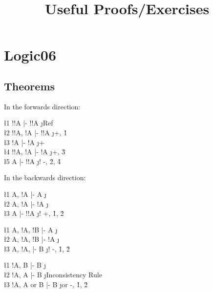 \documentclass[class=cs245,leqno]{agony}
\title{Useful Proofs/Exercises}
\begin{document}
\thispagestyle{firstpage}
\tableofcontents

\section{Logic06}
\subsection{Theorems}
\begin{theorem}
\end{theorem}
\begin{prf}
  In the forwards direction:
  \begin{deduce}
    \l1 !!A     |- !!A \j {Ref}           \\
    \l2 !!A, !A |- !!A \j {+, \r1}        \\
    \l3 !A      |- !A  \j {+}             \\
    \l4 !!A, !A |- !A  \j {+, \r3}        \\
    \l5 A       |- !!A \j {! -, \r2, \r4}
  \end{deduce}
  In the backwards direction:
  \begin{deduce}
    \l1 A, !A |- A   \j {\E}            \\
    \l2 A, !A |- !A  \j {\E}            \\
    \l3 A     |- !!A \j {! +, \r1, \r2}
  \end{deduce}
\end{prf}

\begin{theorem}
\end{theorem}
\begin{prf}
  \begin{deduce}
    \l1 A, !A, !B |- A  \j {\E}            \\
    \l2 A, !A, !B |- !A \j {\E}            \\
    \l3 A, !A,    |- B  \j {! -, \r1, \r2}
  \end{deduce}
\end{prf}

\begin{theorem}
\end{theorem}
\begin{prf}
  \begin{deduce}
    \l1 !A, B      |- B \j {\E}                 \\
    \l2 !A, A      |- B \j {Inconsistency Rule} \\
    \l3 !A, A or B |- B \j {or -, \r1, \r2}
  \end{deduce}
\end{prf}
\end{document}
